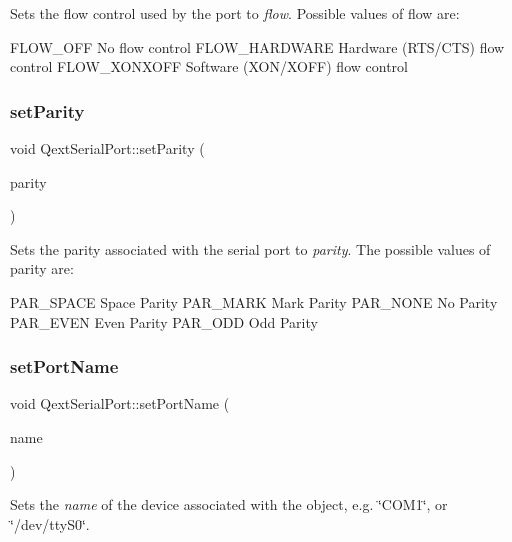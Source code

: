 Sets the flow control used by the port to {\itshape flow}. Possible values of flow are\+: 
\begin{DoxyCode}
FLOW\_OFF            No flow control
FLOW\_HARDWARE       Hardware (RTS/CTS) flow control
FLOW\_XONXOFF        Software (XON/XOFF) flow control
\end{DoxyCode}
 \mbox{\label{classQextSerialPort_aae887a42778a47b36b417278a64cdcf2}} 
\subsubsection{\texorpdfstring{set\+Parity}{setParity}}
{\footnotesize\ttfamily void Qext\+Serial\+Port\+::set\+Parity (\begin{DoxyParamCaption}\item[{Parity\+Type}]{parity }\end{DoxyParamCaption})\hspace{0.3cm}{\ttfamily [slot]}}

Sets the parity associated with the serial port to {\itshape parity}. The possible values of parity are\+: 
\begin{DoxyCode}
PAR\_SPACE       Space Parity
PAR\_MARK        Mark Parity
PAR\_NONE        No Parity
PAR\_EVEN        Even Parity
PAR\_ODD         Odd Parity
\end{DoxyCode}
 \mbox{\label{classQextSerialPort_a9be0f083d807d93bcf30554a2a272d93}} 
\subsubsection{\texorpdfstring{set\+Port\+Name}{setPortName}}
{\footnotesize\ttfamily void Qext\+Serial\+Port\+::set\+Port\+Name (\begin{DoxyParamCaption}\item[{const Q\+String \&}]{name }\end{DoxyParamCaption})\hspace{0.3cm}{\ttfamily [slot]}}

Sets the {\itshape name} of the device associated with the object, e.\+g. \char`\"{}\+C\+O\+M1\char`\"{}, or \char`\"{}/dev/tty\+S0\char`\"{}. \mbox{\label{classQextSerialPort_add89288d28c60a20cbd087576e17b05d}} 
